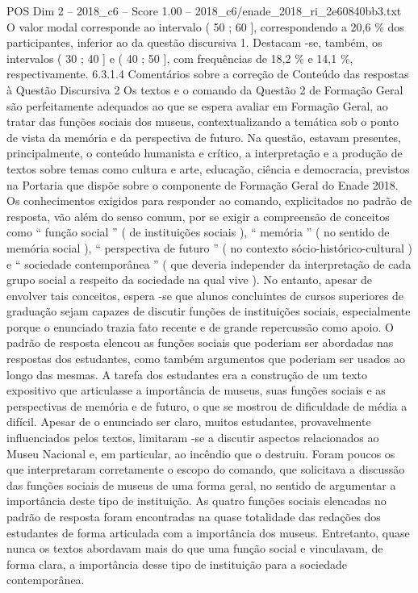 \begin{textsample}{POS Dim 2 – 2018\_c6 – Score 1.00 – 2018\_c6/enade\_2018\_ri\_2e60840bb3.txt}
O valor modal corresponde ao intervalo ( 50 ; 60 ], correspondendo a 20,6 \% dos participantes, inferior ao da questão discursiva 1.
Destacam -se, também, os intervalos ( 30 ; 40 ] e ( 40 ; 50 ], com frequências de 18,2 \% e 14,1 \%, respectivamente. 6.3.1.4 Comentários sobre a correção de Conteúdo das respostas à Questão Discursiva 2 Os textos e o comando da Questão 2 de Formação Geral são perfeitamente adequados ao que se espera avaliar em Formação Geral, ao tratar das funções sociais dos museus, contextualizando a temática sob o ponto de vista da memória e da perspectiva de futuro.
Na questão, estavam presentes, principalmente, o conteúdo humanista e crítico, a interpretação e a produção de textos sobre temas como cultura e arte, educação, ciência e democracia, previstos na Portaria que dispõe sobre o componente de Formação Geral do Enade 2018.
Os conhecimentos exigidos para responder ao comando, explicitados no padrão de resposta, vão além do senso comum, por se exigir a compreensão de conceitos como “ função social ” ( de instituições sociais ), “ memória ” ( no sentido de memória social ), “ perspectiva de futuro ” ( no contexto sócio-histórico-cultural ) e “ sociedade contemporânea ” ( que deveria independer da interpretação de cada grupo social a respeito da sociedade na qual vive ).
No entanto, apesar de envolver tais conceitos, espera -se que alunos concluintes de cursos superiores de graduação sejam capazes de discutir funções de instituições sociais, especialmente porque o enunciado trazia fato recente e de grande repercussão como apoio.
O padrão de resposta elencou as funções sociais que poderiam ser abordadas nas respostas dos estudantes, como também argumentos que poderiam ser usados ao longo das mesmas.
A tarefa dos estudantes era a construção de um texto expositivo que articulasse a importância de museus, suas funções sociais e as perspectivas de memória e de futuro, o que se mostrou de dificuldade de média a difícil.
Apesar de o enunciado ser claro, muitos estudantes, provavelmente influenciados pelos textos, limitaram -se a discutir aspectos relacionados ao Museu Nacional e, em particular, ao incêndio que o destruiu.
Foram poucos os que interpretaram corretamente o escopo do comando, que solicitava a discussão das funções sociais de museus de uma forma geral, no sentido de argumentar a importância deste tipo de instituição.
As quatro funções sociais elencadas no padrão de resposta foram encontradas na quase totalidade das redações dos estudantes de forma articulada com a importância dos museus.
Entretanto, quase nunca os textos abordavam mais do que uma função social e vinculavam, de forma clara, a importância desse tipo de instituição para a sociedade contemporânea.

\end{textsample}
